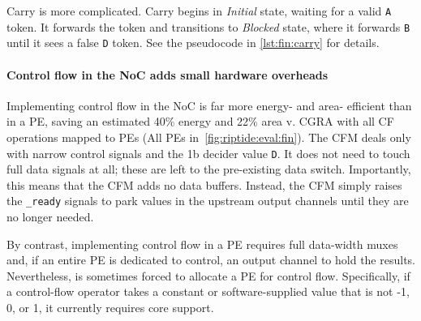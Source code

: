Carry is more complicated.
%
Carry begins in {\em Initial} state, waiting for a valid {\tt A}
token.
%
It forwards the token and transitions to {\em Blocked} state, where
it forwards {\tt B} until it sees a false {\tt D} token.
%
See the pseudocode in \autoref{lst:fin:carry} for details.

\paragraph{Control flow in the NoC adds small hardware overheads}
%
Implementing control flow in the NoC is far more energy- and
area- efficient than in a PE, saving an estimated 40\% energy and 22\% area v. CGRA with all CF operations mapped to PEs (All PEs in~\autoref{fig:riptide:eval:fin}).
%
The CFM deals only with narrow control signals and the 1b decider
value {\tt D}.
%
It does not need to touch full data signals at all; these are
left to the pre-existing data switch.
%
Importantly, this means that the CFM adds no data buffers.
%
Instead, the CFM simply raises the {\tt *\_ready} signals to park
values in the upstream output channels until they are no longer
needed.

By contrast, implementing control flow in a PE requires full
data-width muxes and, if an entire PE is dedicated to control, an
output channel to hold the results.
%
Nevertheless, \riptide is sometimes forced to allocate a PE for control
flow.
%
Specifically, if a control-flow operator takes a constant or
software-supplied value that is not -1, 0, or 1, it currently requires \textmu core support.




  

